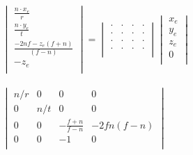 \documentclass[a4paper,12pt]{article}
\begin{document}
\begin{center}
    \begin{math}
        \begin{aligned}
            \begin{vmatrix}
                \frac{n \cdot x_e}{r}       \\
                \frac{n \cdot y_e}{t}       \\
                \frac{-2nf-z_e(f+n)}{(f-n)} \\
                -z_e                        \\
            \end{vmatrix}
            =
            \begin{vmatrix}
                \cdot & \cdot & \cdot & \cdot \\
                \cdot & \cdot & \cdot & \cdot \\
                \cdot & \cdot & \cdot & \cdot \\
                \cdot & \cdot & \cdot & \cdot \\
            \end{vmatrix}
            \begin{vmatrix}
                x_e \\
                y_e \\
                z_e \\
                0   \\
            \end{vmatrix}
        \end{aligned}
    \end{math}
\end{center}

\begin{center}
    \begin{math}
        \begin{aligned}
            \begin{vmatrix}
                n/r & 0   & 0                & 0         \\
                0   & n/t & 0                & 0         \\
                0   & 0   & -\frac{f+n}{f-n} & -2fn(f-n) \\
                0   & 0   & -1               & 0         \\
            \end{vmatrix}
        \end{aligned}
    \end{math}
\end{center}
\end{document}
